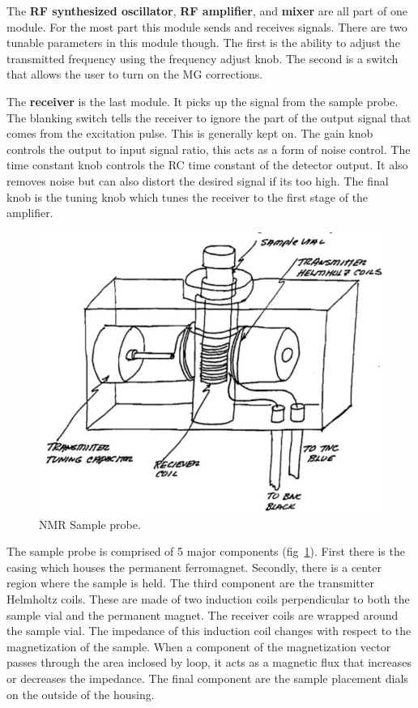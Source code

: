 \documentclass[
reprint,
amsmath,amssymb,
aps,
tikz,
border=5pt
]{revtex4-1}
\begin{document}
    The \textbf{RF synthesized oscillator}, \textbf{RF amplifier}, and \textbf{mixer} are all part of one module. For the most part this module sends and receives signals. There are two tunable parameters in this module though. The first is the ability to adjust the transmitted frequency using the frequency adjust knob. The second is a switch that allows the user to turn on the MG corrections. 
    
    The \textbf{receiver} is the last module. It picks up the signal from the sample probe. The blanking switch tells the receiver to ignore the part of the output signal that comes from the excitation pulse. This is generally kept on. The gain knob controls the output to input signal ratio, this acts as a form of noise control. The time constant knob controls the RC time constant of the detector output. It also removes noise but can also distort the desired signal if its too high. The final knob is the tuning knob which tunes the receiver to the first stage of the amplifier.~\cite{manual}


    \begin{figure}[h]
      \includegraphics[width=0.4 \textwidth]{figures/probe.jpg}
      \caption{NMR Sample probe.\cite{manual}}
      \label{fig:probe}
    \end{figure}

    The sample probe is comprised of 5 major components (fig~\ref{fig:probe}). First there is the casing which houses the permanent ferromagnet. Secondly, there is a center region where the sample is held. The third component are the transmitter Helmholtz coils. These are made of two induction coils perpendicular to both the sample vial and the permanent magnet. The receiver coils are wrapped around the sample vial. The impedance of this induction coil changes with respect to the magnetization of the sample. When a component of the magnetization vector passes through the area inclosed by loop, it acts as a magnetic flux that increases or decreases the impedance. The final component are the sample placement dials on the outside of the housing. 
\end{document}

